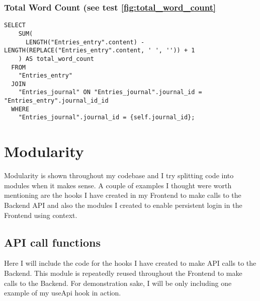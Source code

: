 \subsubsection{Total Word Count (see test \ref{fig:total_word_count}}
\begin{verbatim}
SELECT
    SUM(
      LENGTH("Entries_entry".content) - LENGTH(REPLACE("Entries_entry".content, ' ', '')) + 1
    ) AS total_word_count
  FROM
    "Entries_entry"
  JOIN
    "Entries_journal" ON "Entries_journal".journal_id = "Entries_entry".journal_id_id
  WHERE
    "Entries_journal".journal_id = {self.journal_id};
\end{verbatim}

\section{Modularity}
Modularity is shown throughout my codebase and I try splitting code into modules when it makes sense. A couple of examples I thought were worth mentioning are the hooks I have created in my Frontend to make calls to the Backend API and also the modules I created to enable persistent login in the Frontend using context. 

\subsection{API call functions}
Here I will include the code for the hooks I have created to make API calls to the Backend. This module is repeatedly reused throughout the Frontend to make calls to the Backend. For demonstration sake, I will be only including one example of my useApi hook in action.


